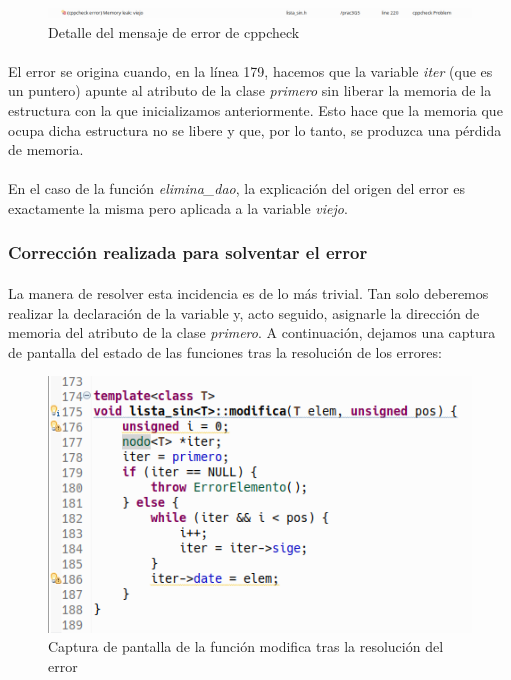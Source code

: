 			\begin{figure}[H]
				\centering
				\includegraphics[scale=0.38]{img/captura46.png}
				\caption{Detalle del mensaje de error de cppcheck}
				\label{captura46}
			\end{figure}
			
			\paragraph{}El error se origina cuando, en la línea 179, hacemos que la variable \textit{iter} (que es un puntero) apunte al atributo de la clase \textit{primero} sin liberar la memoria de la estructura con la que inicializamos anteriormente. Esto hace que la memoria que ocupa dicha estructura no se libere y que, por lo tanto, se produzca una pérdida de memoria. 
			
			\paragraph{}En el caso de la función \textit{elimina\_dao}, la explicación del origen del error es exactamente la misma pero aplicada a la variable \textit{viejo}.
		
		\subsubsection{Corrección realizada para solventar el error}
		
			\paragraph{}La manera de resolver esta incidencia es de lo más trivial. Tan solo deberemos realizar la declaración de la variable y, acto seguido, asignarle la dirección de memoria del atributo de la clase \textit{primero}. A continuación, dejamos una captura de pantalla del estado de las funciones tras la resolución de los errores:
			
			\begin{figure}[H]
				\centering
				\includegraphics[scale=0.7]{img/captura44.png}
				\caption{Captura de pantalla de la función modifica tras la resolución del error}
				\label{captura44}
			\end{figure}
		
